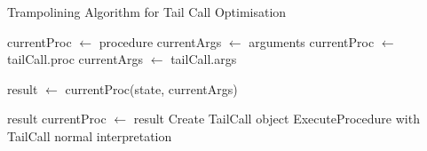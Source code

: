 \documentclass[final]{cmpreport_02}
\begin{document}
\begin{algorithm}
\caption{Trampolining Algorithm for Tail Call Optimisation}
\label{alg:trampoline}
\begin{algorithmic}[1]
\State currentProc $\gets$ procedure
\State currentArgs $\gets$ arguments
        \State currentProc $\gets$ tailCall.proc
        \State currentArgs $\gets$ tailCall.args
    \EndWhile
    
    \State result $\gets$ currentProc(state, currentArgs)
    
        \State \Return result
    \Else
        \State currentProc $\gets$ result
    \EndIf
\EndWhile
\EndProcedure
{}
\State Create TailCall object
\State \Return ExecuteProcedure with TailCall
\Else
\State \Return normal interpretation
\EndIf
\EndProcedure
\end{algorithmic}
\end{algorithm}
\end{document}
